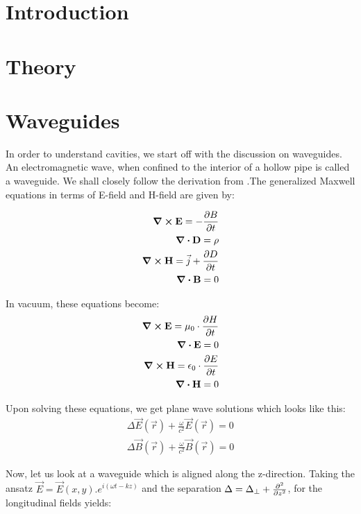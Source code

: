 \documentclass[a4paper]{article}
\begin{document}
\section{Introduction}



\section{Theory}


\section{Waveguides}
In order to understand cavities, we start off with the discussion on waveguides. An electromagnetic wave, when confined to the interior of a hollow pipe is called a waveguide. We shall closely follow the derivation from \cite{}.The generalized Maxwell equations in terms of E-field and H-field are given by:

\begin{align}
		\curl {\vb{{E}}} = - \pdv{{B}}{t} \\
		\div{\vb{D}} = \rho \\
		\curl {\vb{{H}}} = \vec{j} + \pdv{{D}}{t} \\
		\div{\vb{{B}}} = 0 
\end{align}

In vacuum, these equations become: 
\begin{align}
		\curl {\vb{{E}}} = \mu_0 \cdot \pdv{{H}}{t} \\ 
		\div{\vb{{E}}} = 0 \\
		\curl {\vb{{H}}} = \epsilon_{0} \cdot \pdv{{E}}{t} \\
		\div{\vb{{H}}} = 0
\end{align}

Upon solving these equations, we get plane wave solutions which looks like this: 
\begin{align}
		\Delta \vec{E}\left(\vec{r}\right) + \frac{\omega}{c^2} \vec{E}\left(\vec{r}\right) = 0 \\
		\Delta \vec{B}\left(\vec{r}\right) + \frac{\omega}{c^2} \vec{B}\left(\vec{r}\right) = 0 
\end{align}

Now, let us look at a waveguide which is aligned along the z-direction. Taking the ansatz $\vec{E} = \vec{E}(x,y).e^{i(\omega t -kz)}$ and the separation $\Delta = \Delta_{\perp} + \pdv[2]{}{z}$, for the longitudinal fields yields: 
\end{document}

